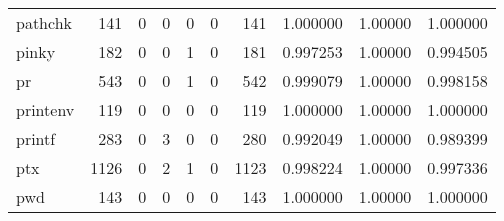 \begin{tabular}{lrrrrrrrrr}
pathchk   &                    141 &                                  0 &                                 0 &                                0 &                                 0 &                             141 &                                1.000000 &                                1.00000 &                             1.000000 \\
pinky     &                    182 &                                  0 &                                 0 &                                1 &                                 0 &                             181 &                                0.997253 &                                1.00000 &                             0.994505 \\
pr        &                    543 &                                  0 &                                 0 &                                1 &                                 0 &                             542 &                                0.999079 &                                1.00000 &                             0.998158 \\
printenv  &                    119 &                                  0 &                                 0 &                                0 &                                 0 &                             119 &                                1.000000 &                                1.00000 &                             1.000000 \\
printf    &                    283 &                                  0 &                                 3 &                                0 &                                 0 &                             280 &                                0.992049 &                                1.00000 &                             0.989399 \\
ptx       &                   1126 &                                  0 &                                 2 &                                1 &                                 0 &                            1123 &                                0.998224 &                                1.00000 &                             0.997336 \\
pwd       &                    143 &                                  0 &                                 0 &                                0 &                                 0 &                             143 &                                1.000000 &                                1.00000 &                             1.000000 \\

\end{tabular}
